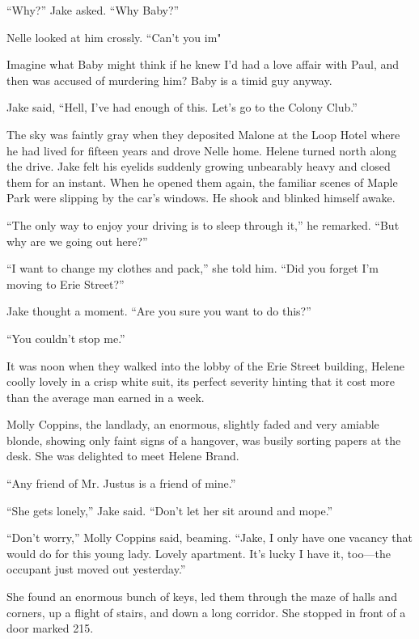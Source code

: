 \documentclass{novel}
\begin{document}
“Why?” Jake asked. “Why Baby?”

Nelle looked at him crossly. “Can’t you im"

Imagine what Baby might think if he knew I’d had a love affair with Paul, and then was accused of murdering him? Baby is a timid guy anyway.

Jake said, “Hell, I've had enough of this. Let’s go to the Colony Club.”

The sky was faintly gray when they deposited Malone at the Loop Hotel where he had lived for fifteen years and drove Nelle home. Helene turned north along the drive. Jake felt his eyelids suddenly growing unbearably heavy and closed them for an instant. When he opened them again, the familiar scenes of Maple Park were slipping by the car’s windows. He shook and blinked himself awake.

“The only way to enjoy your driving is to sleep through it,” he remarked. “But why are we going out here?”

“I want to change my clothes and pack,” she told him. “Did you forget I’m moving to Erie Street?”

Jake thought a moment. “Are you sure you want to do this?”

“You couldn’t stop me.”

It was noon when they walked into the lobby of the Erie Street building, Helene coolly lovely in a crisp white suit, its perfect severity hinting that it cost more than the average man earned in a week.

Molly Coppins, the landlady, an enormous, slightly faded and very amiable blonde, showing only faint signs of a hangover, was busily sorting papers at the desk. She was delighted to meet Helene Brand.

“Any friend of Mr. Justus is a friend of mine.”

“She gets lonely,” Jake said. “Don’t let her sit around and mope.”

“Don’t worry,” Molly Coppins said, beaming. “Jake, I only have one vacancy that would do for this young lady. Lovely apartment. It’s lucky I have it, too—the occupant just moved out yesterday.”

She found an enormous bunch of keys, led them through the maze of halls and corners, up a flight of stairs, and down a long corridor. She stopped in front of a door marked 215.

\vspace{2\nbs}
\clearpage
\thispagestyle{empty}
\end{document}
